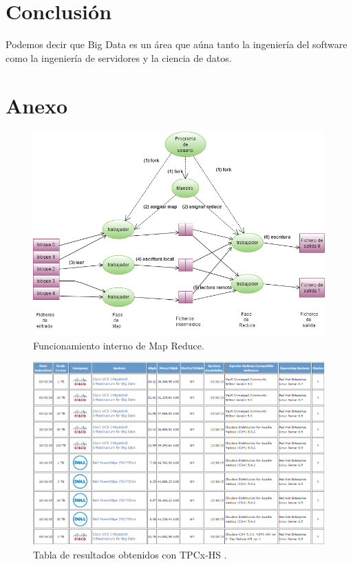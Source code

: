 \documentclass[10pt]{article}
\begin{document}
\section{Conclusión} \label{sec:conclusion}

	Podemos decir que Big Data es un área que aúna tanto la ingeniería del software como la ingeniería de servidores y la ciencia de datos.


\printbibliography


\section*{Anexo}

	\begin{figure}[H]
		\centering
		\includegraphics[width=14cm]{./images/MapReduce-MasterWorkers.png}
		\caption{Funcionamiento interno de Map Reduce.} 
		\label{fig:map-reduce:master-workers}
	\end{figure}

			
	\begin{figure}[H]
		\centering
		\includegraphics[width=15cm]{./images/examples.png}
		\caption{Tabla de resultados obtenidos con TPCx-HS \cite{ejemplos}.} 
		\label{fig:ejemplo}
	\end{figure}
\end{document}
